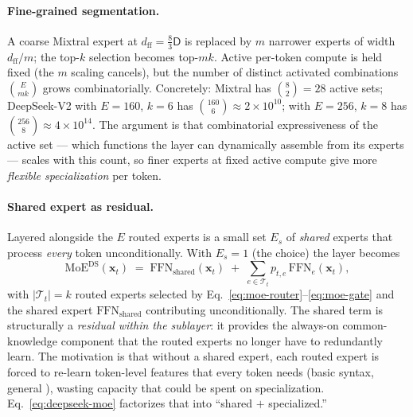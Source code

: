 \paragraph{Fine-grained segmentation.}
A coarse Mixtral expert at $d_{\text{ff}} = \tfrac{8}{3}\mathsf{D}$ is
replaced by $m$ narrower experts of width $d_{\text{ff}}/m$; the
top-$k$ selection becomes top-$mk$. Active per-token compute is held
fixed (the $m$ scaling cancels), but the number of distinct activated
combinations $\binom{E}{mk}$ grows combinatorially. Concretely:
Mixtral has $\binom{8}{2} = 28$ active sets; DeepSeek-V2 with
$E = 160$, $k = 6$ has $\binom{160}{6} \approx 2 \times 10^{10}$;
 with $E = 256$, $k = 8$ has
$\binom{256}{8} \approx 4 \times 10^{14}$. The argument is that
combinatorial expressiveness of the active set --- which functions
the layer can dynamically assemble from its experts --- scales with
this count, so finer experts at fixed active compute give more
\emph{flexible specialization} per token.

\paragraph{Shared expert as residual.}
Layered alongside the $E$ routed experts is a small set $E_s$ of
\emph{shared} experts that process \emph{every} token unconditionally.
With $E_s = 1$ (the  choice) the layer becomes
\begin{equation}
  \mathrm{MoE}^{\text{DS}}(\mathbf{x}_t)
  \;=\;
  \mathrm{FFN}_{\text{shared}}(\mathbf{x}_t)
  \;+\; \sum_{e \in \mathcal{T}_t} p_{t,e}\,\mathrm{FFN}_e(\mathbf{x}_t),
  \label{eq:deepseek-moe}
\end{equation}
with $|\mathcal{T}_t| = k$ routed experts selected by
Eq.~\eqref{eq:moe-router}--\eqref{eq:moe-gate} and the shared expert
$\mathrm{FFN}_{\text{shared}}$ contributing unconditionally. The
shared term is structurally a \emph{residual within the 
sublayer}: it provides the always-on common-knowledge component that
the routed experts no longer have to redundantly learn. The motivation
is that without a shared expert, each routed expert is forced to
re-learn token-level features that every token needs (basic syntax,
general ), wasting capacity that could be spent on
specialization. Eq.~\eqref{eq:deepseek-moe} factorizes that into
``shared $+$ specialized.''

